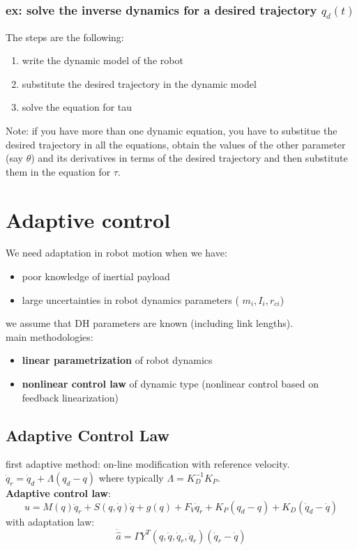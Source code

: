 \documentclass[a4paper,12pt]{article}
\begin{document}
\subsubsection{ex: solve the inverse dynamics for a desired trajectory $q_d(t)$}
The steps are the following:
\begin{enumerate}
    \item write the dynamic model of the robot
    \item substitute the desired trajectory in the dynamic model
    \item solve the equation for tau
\end{enumerate}
Note: if you have more than one dynamic equation, you have to
substitue the desired trajectory in all the equations,
obtain the values of the other parameter (say $\theta$) and its derivatives
in terms of the desired trajectory and then substitute them in the
equation for $\tau$.



\section{Adaptive control}
We need adaptation in robot motion when we have:
\begin{itemize}
    \item poor knowledge of inertial payload
    \item large uncertainties in robot dynamics parameters (
        $m_i, I_i, r_{ci}$)
\end{itemize}
we assume that DH parameters are known (including link lengths).\\
main methodologies:
\begin{itemize}
    \item \textbf{linear parametrization} of robot dynamics 
    \item \textbf{nonlinear control law} of dynamic type (nonlinear control
    based on feedback linearization) 
\end{itemize}
\subsection{Adaptive Control Law}
first adaptive method: on-line modification with reference velocity.\\
$\dot{q}_r = \dot{q}_d + \Lambda(q_d - q)$ where typically $\Lambda=K_D^{-1}K_P$.\\
\textbf{Adaptive control law}:
\begin{equation}
    u = M(q)\ddot{q}_r + S(q,\dot{q})\dot{q} + g(q) + F_V\dot{q}_r + K_P(q_d-q) + K_D(\dot{q}_d-\dot{q})
\end{equation}
with adaptation law:
\begin{equation}
    \dot{\hat{a}} = \Gamma Y^T(q,\dot{q},\dot{q}_r,\ddot{q}_r)(\dot{q}_r-\dot{q})
\end{equation}
\end{document}
